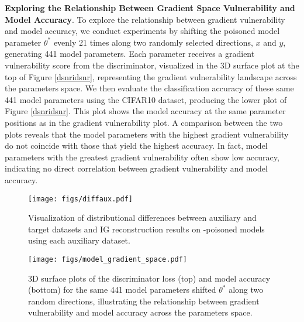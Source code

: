\textbf{Exploring the Relationship Between Gradient Space Vulnerability and Model Accuracy}.
To explore the relationship between gradient vulnerability and model accuracy, we conduct experiments by shifting the poisoned model parameter $\theta^{*}$ evenly 21 times along two randomly selected directions, $x$ and $y$, generating 441 model parameters. Each parameter receives a gradient vulnerability score from the discriminator, visualized in the 3D surface plot at the top of Figure \ref{dsnridsnr}, representing the gradient vulnerability landscape across the parameters space. We then evaluate the classification accuracy of these same 441 model parameters using the CIFAR10 dataset, producing the lower plot of Figure \ref{dsnridsnr}. This plot shows the model accuracy at the same parameter positions as in the gradient vulnerability plot. A comparison between the two plots reveals that the model parameters with the highest gradient vulnerability do not coincide with those that yield the highest accuracy. In fact, model parameters with the greatest gradient vulnerability often show low accuracy, indicating no direct correlation between gradient vulnerability and model accuracy.
\begin{figure*}[t]
    \centering
    \texttt{[image: figs/diffaux.pdf]}
    \caption{Visualization of distributional differences between auxiliary and target datasets and IG reconstruction results on \name-poisoned models using each auxiliary dataset.}
    \label{diffaux}
\end{figure*}
\begin{figure}[h]
    \centering
    \texttt{[image: figs/model\_gradient\_space.pdf]}
    \caption{3D surface plots of the discriminator loss (top) and model accuracy (bottom) for the same 441 model parameters shifted $\theta^{*}$ along two random directions, illustrating the relationship between gradient vulnerability and model accuracy across the parameters space.}
    \label{model_gradient_space}
\end{figure}
